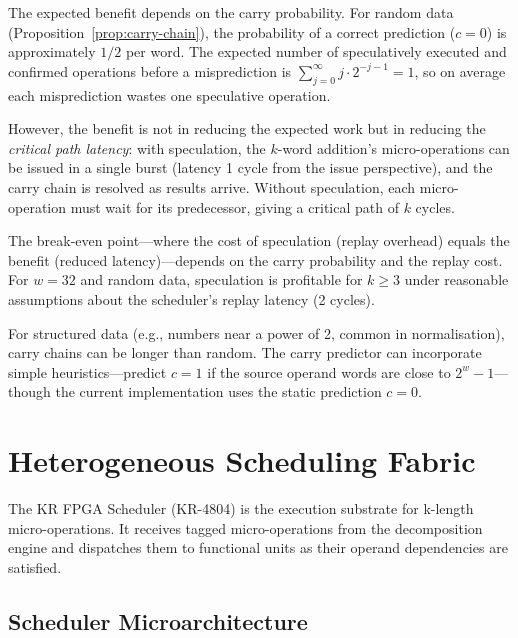 \documentclass[11pt,a4paper]{article}
\begin{document}
The expected benefit depends on the carry probability.  For random data
(Proposition~\ref{prop:carry-chain}), the probability of a correct prediction
($c = 0$) is approximately $1/2$ per word.  The expected number of
speculatively executed and confirmed operations before a misprediction is
$\sum_{j=0}^{\infty} j \cdot 2^{-j-1} = 1$, so on average each misprediction
wastes one speculative operation.

However, the benefit is not in reducing the expected work but in reducing
the \emph{critical path latency}: with speculation, the $k$-word addition's
micro-operations can be issued in a single burst (latency 1 cycle from the
issue perspective), and the carry chain is resolved as results arrive.
Without speculation, each micro-operation must wait for its predecessor, giving
a critical path of $k$ cycles.

The break-even point---where the cost of speculation (replay overhead) equals
the benefit (reduced latency)---depends on the carry probability and the
replay cost.  For $w = 32$ and random data, speculation is profitable for
$k \ge 3$ under reasonable assumptions about the scheduler's replay latency
(2 cycles).

For structured data (e.g., numbers near a power of 2, common in
normalisation), carry chains can be longer than random.  The carry predictor
can incorporate simple heuristics---predict $c = 1$ if the source operand
words are close to $2^w - 1$---though the current implementation uses the
static prediction $c = 0$.


\section{Heterogeneous Scheduling Fabric}
\label{sec:scheduler}

The KR FPGA Scheduler (KR-4804) is the execution substrate for k-length
micro-operations.  It receives tagged micro-operations from the decomposition
engine and dispatches them to functional units as their operand dependencies
are satisfied.

\subsection{Scheduler Microarchitecture}
\label{sec:sched-uarch}
\end{document}
